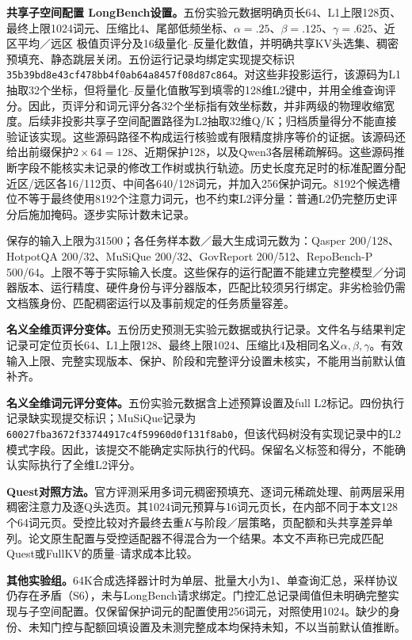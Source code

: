 \documentclass[10pt,letterpaper]{article}
\begin{document}
\textbf{共享子空间配置 LongBench设置。}五份实验元数据明确页长64、L1上限128页、最终上限1024词元、压缩比4、尾部低频坐标、$\alpha=.25$、$\beta=.125$、$\gamma=.625$、近区平均／远区 极值页评分及16级量化--反量化数值，并明确共享KV头选集、稠密预填充、静态跳层关闭。五份运行记录均绑定实现提交标识\texttt{35b39bd8\allowbreak{}e43cf478\allowbreak{}bb4f0ab6\allowbreak{}4a8457f0\allowbreak{}8d87c864}。对这些非投影运行，该源码为L1抽取32个坐标，但将量化--反量化值散写到填零的128维L2键中，并用全维查询评分。因此，页评分和词元评分各32个坐标指有效坐标数，并非两级的物理收缩宽度。后续非投影共享子空间配置路径为L2抽取32维Q/K；归档质量得分不能直接验证该实现。这些源码路径不构成运行核验或有限精度排序等价的证据。该源码还给出前缀保护$2\times64=128$、近期保护128，以及Qwen3各层稀疏解码。这些源码推断字段不能核实未记录的修改工作树或执行轨迹。历史长度充足时的标准配置分配近区/远区各16/112页、中间各640/128词元，并加入256保护词元。8192个候选槽位不等于最终使用8192个注意力词元，也不约束L2评分量：普通L2仍完整历史评分后施加掩码。逐步实际计数未记录。

保存的输入上限为31500；各任务样本数／最大生成词元数为：Qasper 200/128、HotpotQA 200/32、MuSiQue 200/32、GovReport 200/512、RepoBench-P 500/64。上限不等于实际输入长度。这些保存的运行配置不能建立完整模型／分词器版本、运行精度、硬件身份与评分器版本，匹配比较须另行绑定。非劣检验仍需文档簇身份、匹配稠密运行以及事前规定的任务质量容差。

\textbf{名义全维页评分变体。}五份历史预测无实验元数据或执行记录。文件名与结果判定记录可定位页长64、L1上限128、最终上限1024、压缩比4及相同名义$\alpha,\beta,\gamma$。有效输入上限、完整实现版本、保护、阶段和完整评分设置未核实，不能用当前默认值补齐。

\textbf{名义全维词元评分变体。}五份实验元数据含上述预算设置及full L2标记。四份执行记录缺实现提交标识；MuSiQue记录为\texttt{60027fba\allowbreak{}3672f337\allowbreak{}44917c4f\allowbreak{}59960d0f\allowbreak{}131f8ab0}，但该代码树没有实现记录中的L2模式字段。因此，该提交不能确定实际执行的代码。保留名义标签和得分，不能确认实际执行了全维L2评分。

\textbf{Quest对照方法。}官方评测采用多词元稠密预填充、逐词元稀疏处理、前两层采用稠密注意力及逐Q头选页。其1024词元预算与16词元页长，在内部不同于本文128个64词元页。受控比较对齐最终去重$K$与阶段／层策略，页配额和头共享差异单列。论文原生配置与受控适配器不得混合为一个结果。本文不声称已完成匹配Quest或FullKV的质量--请求成本比较。

\textbf{其他实验组。}64K合成选择器计时为单层、批量大小为1、单查询汇总，采样协议仍存在矛盾（S6），未与LongBench请求绑定。门控汇总记录阈值但未明确完整实现与子空间配置。仅保留保护词元的配置使用256词元，对照使用1024。缺少的身份、未知门控与配额回填设置及未测完整成本均保持未知，不以当前默认值推断。
\end{document}
